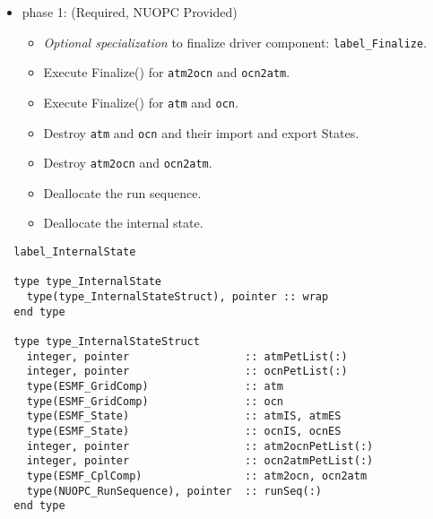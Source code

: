 \begin{itemize}
\item phase 1: ({\sc Required, NUOPC Provided})
  \begin{itemize}
  \item {\it Optional specialization} to finalize driver component: {\tt label\_Finalize}.
  \item Execute Finalize() for {\tt atm2ocn} and {\tt ocn2atm}.
  \item Execute Finalize() for {\tt atm} and {\tt ocn}.
  \item Destroy {\tt atm} and {\tt ocn} and their import and export States.
  \item Destroy {\tt atm2ocn} and {\tt ocn2atm}.
  \item Deallocate the run sequence.
  \item Deallocate the internal state.
  \end{itemize}      
\end{itemize}

\begin{verbatim}  label_InternalState

  type type_InternalState
    type(type_InternalStateStruct), pointer :: wrap
  end type

  type type_InternalStateStruct
    integer, pointer                  :: atmPetList(:)
    integer, pointer                  :: ocnPetList(:)
    type(ESMF_GridComp)               :: atm
    type(ESMF_GridComp)               :: ocn
    type(ESMF_State)                  :: atmIS, atmES
    type(ESMF_State)                  :: ocnIS, ocnES
    integer, pointer                  :: atm2ocnPetList(:)
    integer, pointer                  :: ocn2atmPetList(:)
    type(ESMF_CplComp)                :: atm2ocn, ocn2atm
    type(NUOPC_RunSequence), pointer  :: runSeq(:)
  end type

\end{verbatim}

